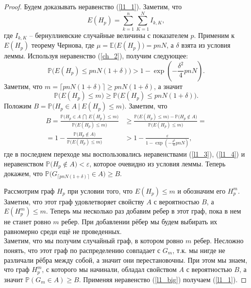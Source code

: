 \documentclass{matmex-diploma-custom}
\newcommand{\Expect}{\mathbb E}
\newcommand{\PRob}{\mathbb P}
\newcommand{\leqs}{\leqslant}
\newcommand{\geqs}{\geqslant}
\newcommand{\eps}{\varepsilon}
\theoremstyle{named}
\begin{document}
\begin{proof}
Будем доказывать неравенство (\ref{l1_1}). Заметим, что 
\begin{equation}
E(H_p) = \sum_{k=1}^n \sum_{K=1}^N I_{k, K},
\end{equation}
где $I_{k,K}$ -- бернуллиевские случайные величины с показателем $p$.
Применим к $E(H_p)$ теорему Чернова, где $\mu = \Expect\big(E(H_p)\big) = pnN$, а $\delta$ взята из условия леммы.
Используя неравенство (\ref{ch_2}), получим следующее:
\begin{equation}\label{l1_3}
\PRob\Big( E(H_p) \leqs pnN(1+\delta) \Big) > 1 - \exp\left(-\frac{\delta^2}{4}pnN\right).
\end{equation}
Заметим, что $m = \lceil pnN(1+\delta) \rceil \geqs pnN(1+\delta)$, а значит
\begin{equation}\label{l1_4}
\PRob\Big( E(H_p) \leqs m \Big) \geqs \PRob\Big( E(H_p) \leqs pnN(1+\delta) \Big).
\end{equation}
Положим $B = \PRob\Big( H_p \in A~\big|~E(H_p) \leqs m \Big)$. Заметим, что
\begin{equation}\label{l1_big}
\begin{aligned}
B = \frac{
		\PRob\Big( H_p \in A~\bigcap~E(H_p) \leqs m \Big)
	}{
		\PRob\big(E(H_p) \leqs m \big)
	} 
&\geqs 
	\frac{
		\PRob\big(E(H_p) \leqs m \big) 
			-
		\PRob\big(H_p \not\in A \big)
	}{
		\PRob\big(E(H_p) \leqs m\big)
	}
=
\\
=
	1 
		-
	\frac{
		\PRob\big(H_p \not\in A \big)
	}{
		\PRob\big(E(H_p) \leqs m\big)
	}
&>
	1
		-
	\frac{\eps}{
		1 - \exp\left(-\frac{\delta^2}{4}pnN\right)
	},
\end{aligned}\end{equation}
где в последнем переходе мы воспользовались неравенствами (\ref{l1_3}), (\ref{l1_4}) 
и неравенством $\PRob\big(H_p \not\in A \big) < \eps$, которое очевидно из условия леммы.
Теперь докажем, что $\PRob\big(G_{\lceil pnN(1+\delta) \rceil} \in A\big) \geqs B$.

Рассмотрим граф $H_p$ при условии того, что $E(H_p) \leqs m$ и обозначим его $H_p^m$. 
Заметим, что этот граф удовлетворяет свойству $A$ с вероятностью $B$, а $E(H_p^m) \leqs m$.
Теперь мы несколько раз добавим ребер в этот граф, пока в нем не станет ровно $m$ ребер. 
При добавлении рёбер мы будем выбирать их равномерно среди ещё не проведенных.
\\
Заметим, что мы получим случайный граф, в котором ровно $m$ ребер. Несложно понять, 
что этот граф по распределению совпадает с $G_m$, т.к. мы нигде не различали рёбра между собой, а значит они перестановочны.
При этом мы знаем, что граф $H_p^m$, с которого мы начинали, обладал свойством $A$ с вероятностью $B$, 
а значит $\PRob(G_m \in A) \geqs B$. Применяя неравенство (\ref{l1_big}) получаем (\ref{l1_1}).


\end{proof}
\end{document}
